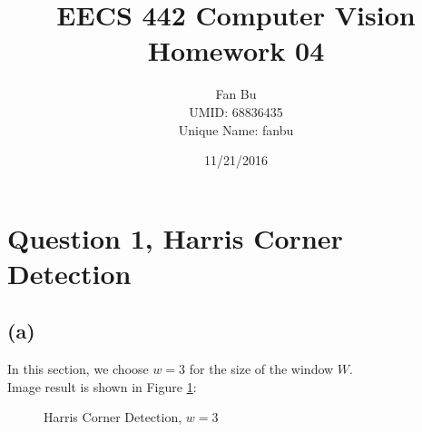 \documentclass[letterpaper]{article}
\author{Fan Bu\\ UMID: 68836435\\ Unique Name: fanbu}
\title{EECS 442 Computer Vision Homework 04}
\begin{document}
\date{11/21/2016}
\maketitle

\newcommand{\trace}{\mathrm{trace}}
\newcommand{\real}{\mathbb R}  %
\newcommand{\nat}{\mathbb N}   %
\newcommand{\cp}{\mathbb C}    %
\newcommand{\ds}{\displaystyle}
\newcommand{\mf}[2]{\frac{\ds #1}{\ds #2}}
\newcommand{\spanof}[1]{\textrm{span} \{ #1 \}}
\newcommand{\sol}[0]{\textbf{Solution: }}
\newcommand{\pf}[0]{\textbf{Proof:}}
\newcommand{\rme}[0]{\textrm{e}}
\newcommand{\Null}[1]{\textrm{Null}\{#1\}}
\parindent 0pt
\section*{Question 1, Harris Corner Detection}
\subsection*{(a)}
In this section, we choose $w =3 $ for the size of the window $W$.\\

Image result is shown in Figure \ref{q1_a_w_3}:\\
\begin{figure}[H] \centering
{}
\caption{Harris Corner Detection, $w=3$}
\label{q1_a_w_3}
\end{figure}
\end{document}
